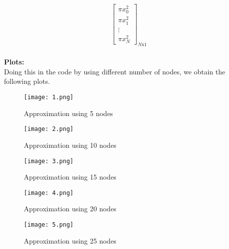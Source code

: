 \documentclass[letterpaper]{exam}
\begin{document}
\begin{questions}
\begin{solution}
\begin{align*}
\begin{bmatrix}
    \pi x_0^2\\
    \pi x_1^2\\
    \vdots\\
    \pi x_N^2
    \end{bmatrix}_{N\text{x}1}
\end{align*}
\\
\textbf{Plots:}
\\
Doing this in the code by using different number of nodes, we obtain the following plots.
\begin{figure}[H]  
     \centering
    \texttt{[image: 1.png]}
     \label{fig:Dendrogram for the problem 3(c)}
     \caption{Approximation using 5 nodes}
\end{figure}
\begin{figure}[H]  
     \centering
    \texttt{[image: 2.png]}
     \label{fig:Dendrogram for the problem 3(c)}
     \caption{Approximation using 10 nodes}
\end{figure}
\begin{figure}[H]  
     \centering
    \texttt{[image: 3.png]}
     \label{fig:Dendrogram for the problem 3(c)}
     \caption{Approximation using 15 nodes}
\end{figure}
\begin{figure}[H]  
     \centering
    \texttt{[image: 4.png]}
     \label{fig:Dendrogram for the problem 3(c)}
     \caption{Approximation using 20 nodes}
\end{figure}
\begin{figure}[H]  
     \centering
    \texttt{[image: 5.png]}
     \label{fig:Dendrogram for the problem 3(c)}
     \caption{Approximation using 25 nodes}
\end{figure}

\end{solution}
\end{questions}
\end{document}
